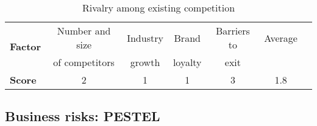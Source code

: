 \begin{table}[H]
\centering
\caption{Rivalry among existing competition}
\label{tab:rivalry}
\begin{tabular}{lcccccc}
\toprule
\multirow{2}{*}{\textbf{Factor}} & Number and size       & Industry   & Brand          & Barriers to    & Average   \\
                                 & of competitors        & growth     & loyalty        & exit           &           \\\midrule
\textbf{Score}                   & 2                     & 1          & 1              & 3              & 1.8       \\\bottomrule
\end{tabular}%
\end{table}

\subsection{Business risks: PESTEL}

